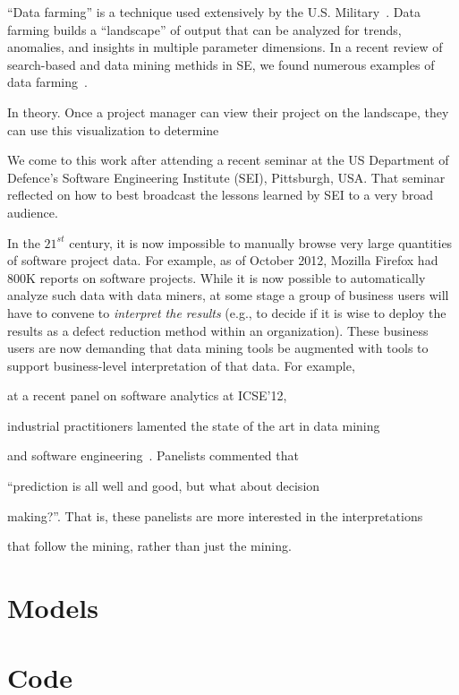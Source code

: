 \documentclass[runningheads]{llncs}
\begin{document}
``Data farming'' is a technique used extensively by the
U.S. Military~\cite{meyer04}.
Data farming builds a ``landscape''
of output that can be analyzed for trends, anomalies, and insights in
multiple parameter dimensions.  
In  a recent review of search-based and data mining methids in SE,
we found numerous examples
of data farming~\cite{strickland03,Myrtveit,Shepperd01,pearce99,vanlamsweerde98integrating,chung00,me03j,heaven11,rodriguez11,jian09}.

In theory. Once a project manager can view their project on the landscape,
they can use this visualization to determine

We come to this work after attending a recent seminar at the US 
Department of Defence's Software Engineering Institute (SEI), Pittsburgh, USA.
That seminar reflected on how to best broadcast the lessons learned by SEI
to a very broad audience.

In the $21^{st}$ century, it is now impossible to manually browse very
large quantities of software project data.
For example, as of October 2012,
Mozilla Firefox had 800K reports on software projects.  While it is
now possible to automatically analyze such data with data miners, at
some stage a group of business users will have to convene to {\em
  interpret the results} (e.g., to decide if it is wise to deploy the
results as a defect reduction method within an organization).
These business  users are now demanding that data mining tools
be augmented with tools to support  business-level
interpretation of that data. For example,

at a recent panel on software analytics at ICSE'12,

industrial practitioners lamented the state of the art in data mining

and software engineering~\cite{menzies12a}. Panelists commented that

``prediction is all well and good, but what about decision

making?''. That is, these panelists are more interested in the interpretations

that follow the mining, rather than just  the mining.



\section{Models}


\section{Code}

\end{document}
